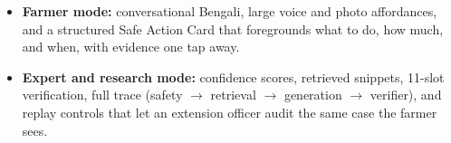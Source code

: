\begin{itemize}
    \item \textbf{Farmer mode:} conversational Bengali, large voice and photo affordances, and a structured Safe Action Card that foregrounds what to do, how much, and when, with evidence one tap away.
    \item \textbf{Expert and research mode:} confidence scores, retrieved snippets, 11-slot verification, full trace (safety $\rightarrow$ retrieval $\rightarrow$ generation $\rightarrow$ verifier), and replay controls that let an extension officer audit the same case the farmer sees.
\end{itemize}
